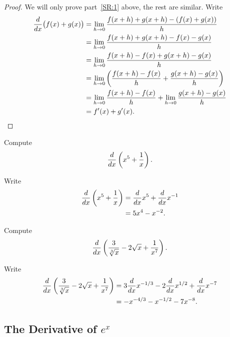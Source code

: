 \begin{proof}
We will only prove part~\ref{SR:1} above, the rest are similar. Write
\begin{align*}
\frac{d}{dx}\big(f(x)+g(x)\big) &= \lim_{ h\to 0} {f(x+h)+g(x+ h) - (f(x)+g(x))\over  h}  \\
&= \lim_{ h\to 0} {f(x+h)+g(x+ h) - f(x)-g(x)\over  h}  \\
&= \lim_{ h\to 0} {f(x+h)-f(x) +g(x+ h) -g(x)\over  h}  \\
&= \lim_{ h\to 0} \left({f(x+h)-f(x)\over  h}  +{g(x+ h) -g(x)\over  h}\right)  \\
&= \lim_{ h\to 0} {f(x+h)-f(x)\over  h}  +
\lim_{ h\to 0} {g(x+ h) -g(x)\over  h}  \\
&=f'(x)+g'(x).
\end{align*}
\end{proof}



\begin{example}
Compute
\[
\frac{d}{dx} \left( x^5+\frac{1}{x}\right).
\] 
\end{example}

\begin{solution}
Write
\begin{align*}
\frac{d}{dx} \left(x^5+\frac{1}{x}\right) &= \frac{d}{dx} x^5 + \frac{d}{dx} x^{-1} \\
&=5x^4 - x^{-2}.
\end{align*}
\end{solution}

\begin{example}
Compute
\[
\frac{d}{dx} \left(\frac{3}{\sqrt[3]{x}}-2\sqrt{x}+\frac{1}{x^7}\right).
\]
\end{example}

\begin{solution}
Write
\begin{align*}
\frac{d}{dx} \left(\frac{3}{\sqrt[3]{x}}-2\sqrt{x}+\frac{1}{x^7}\right) &= 3\frac{d}{dx} x^{-1/3} -2\frac{d}{dx} x^{1/2}+\frac{d}{dx} x^{-7}\\
&=-x^{-4/3} - x^{-1/2}-7x^{-8}.
\end{align*}
\end{solution}



\subsection{The Derivative of $\textit{e}^\textit{x}$}


